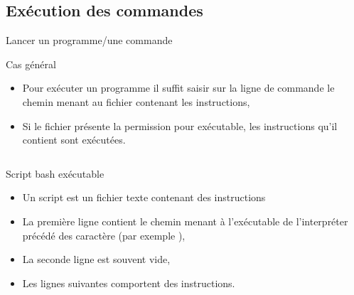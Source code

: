\subsection{Exécution des commandes}
\begin{frame}{Lancer un programme/une commande}
  \begin{block}{Cas général}
    \begin{itemize}
    \item Pour exécuter un programme il suffit saisir sur la ligne de commande
      le chemin menant au fichier contenant les instructions,
    \item Si le fichier présente la permission  pour exécutable, les
      instructions qu'il contient sont exécutées.
    \end{itemize}
  \end{block}
  \begin{columns}
    \begin{column}{.45\textwidth}
      \begin{block}{Script {bash} exécutable}
        \begin{itemize}
        \item Un script  est un fichier texte contenant des
          instructions 
        \item La première ligne contient le chemin menant à l'exécutable de
          l'interpréter précédé des caractère \lin{\#!} (par exemple ),
        \item La seconde ligne est souvent vide,
        \item Les lignes suivantes comportent des instructions.
        \end{itemize}
      \end{block}
    \end{column}
    \begin{column}{.45\textwidth}
      
    \end{column}
  \end{columns}
\end{frame}

